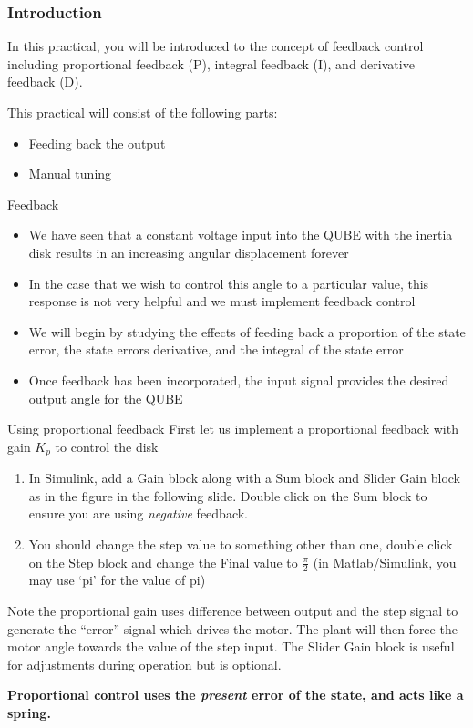 \documentclass[9pt]{beamer-control}
\begin{document}

\begin{frame}
\frametitle{Introduction}
In this practical, you will be introduced to the concept of feedback control including proportional feedback (P), integral feedback (I), and derivative feedback (D).

\vfill

This practical will consist of the following parts:
\begin{itemize}
\item Feeding back the output
\item Manual tuning
\end{itemize}
\end{frame}



\begin{frame}{Feedback}
\begin{itemize}
\item We have seen that a constant voltage input into the QUBE with the inertia disk results in an increasing angular displacement forever
\item In the case that we wish to control this angle to a particular value, this response is not very helpful and we must implement feedback control
\item We will begin by studying the effects of feeding back a proportion of the state error, the state errors derivative, and the integral of the state error
\item Once feedback has been incorporated, the input signal provides the desired output angle for the QUBE
\end{itemize}
\end{frame}

\begin{frame}{Using proportional feedback}
First let us implement a proportional feedback with gain $K_p$ to control the disk
\begin{enumerate}
	\item In Simulink, add a Gain block along with a Sum block and Slider Gain block as in the figure in the following slide. Double click on the Sum block to ensure you are using \textit{negative} feedback.
	\item You should change the step value to something other than one, double click on the Step block and change the Final value to $\tfrac{\pi}{2}$ (in Matlab/Simulink, you may use ‘pi’ for the value of pi)
\end{enumerate}
Note the proportional gain uses difference between output and the step signal to generate the “error” signal which drives the motor. The plant will then force the motor angle towards the value of the step input. The Slider Gain block is useful for adjustments during operation but is optional.
	
\textbf{Proportional control uses the \textit{present} error of the state, and acts like a spring.}
	
\end{frame}
\end{document}
